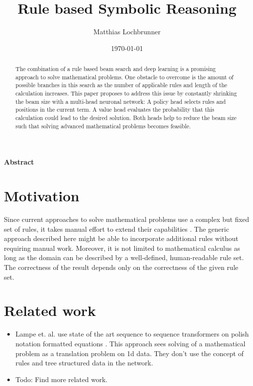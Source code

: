 \documentclass{scrartcl}
\title{Rule based Symbolic Reasoning}
\author{Matthias Lochbrunner}
\date{\today}
\theoremstyle{definition}
\begin{document}
\maketitle
\begin{center}
	\textbf{Abstract}
\end{center}
\begin{abstract}
	The combination of a rule based beam search and deep learning is a promising approach to solve mathematical problems.
	One obstacle to overcome is the amount of possible branches in this search as the number of applicable rules and length of the calculation increases.
	This paper proposes to address this issue by constantly shrinking the beam size with a multi-head neuronal network:
	A policy head selects rules and positions in the current term.
	A value head evaluates the probability that this calculation could lead to the desired solution.
	Both heads help to reduce the beam size such that solving advanced mathematical problems becomes feasible.
\end{abstract}

\section{Motivation}

Since current approaches to solve mathematical problems use a complex but fixed set of rules, it takes manual effort to extend their capabilities \cite{wolfram}.
The generic approach described here might be able to incorporate additional rules without requiring manual work.
Moreover, it is not limited to mathematical calculus as long as the domain can be described by a well-defined, human-readable rule set.
The correctness of the result depends only on the correctness of the given rule set.

\section{Related work}

\begin{itemize}
	\item Lampe et. al. use state of the art sequence to sequence transformers on polish notation formatted equations \cite{Lample2020Deep}.
	This approach sees solving of a mathematical problem as a translation problem on 1d data.
	They don't use the concept of rules and tree structured data in the network.
	\item Todo: Find more related work.
\end{itemize}
\end{document}
